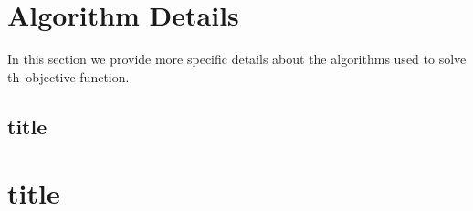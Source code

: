 \documentclass[12pt,letter]{article}\usepackage[]{graphicx}\usepackage[]{color}
\begin{document}
%
%




\newpage

\appendix

\section{Algorithm Details}

In this section we provide more specific details about the algorithms used to solve th~objective function.

\subsection{title}


\section{title}
\end{document}
